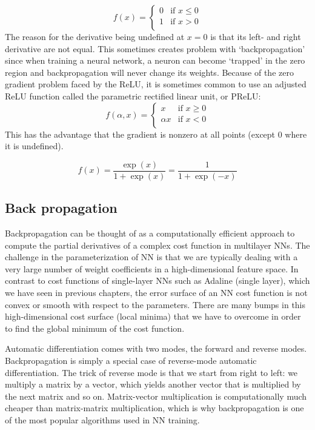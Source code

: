 \documentclass[11pt]{article}
\begin{document}
\begin{equation} 
f(x)=
\begin{cases} 
0 & \text{if  }  x \le 0 \\
1 & \text{if  }  x > 0 \\
\end{cases}
\end{equation} 
The reason for the derivative being undefined at $x=0$ is that its left- and right derivative are not equal. 
This sometimes creates problem with `backpropagation' since 
when training a neural network, a neuron can become `trapped' in the zero region 
and backpropagation will never change its weights. Because of the zero gradient problem faced by the ReLU, 
it is sometimes common to use an adjusted ReLU function called the parametric rectified linear unit, or PReLU:
\begin{equation} 
f(\alpha, x)=
\begin{cases} 
x & \text{if  }  x \ge 0 \\
\alpha x & \text{if  }  x < 0 \\
\end{cases}
\end{equation} 
This has the advantage that the gradient is nonzero at all points (except 0 where it is undefined).


\begin{equation} 
f(x) = \dfrac{\exp(x)}{1+\exp(x)} = \dfrac{1}{1+\exp(-x)}
\end{equation} 



\subsection{Back propagation} 


Backpropagation can be thought of 
as a computationally efficient approach to 
compute the partial derivatives of a complex cost function
in multilayer NNs. The challenge in the parameterization of NN
is that we are typically dealing with a very large number of weight coefficients in a 
high-dimensional feature space. In contrast to cost functions of single-layer NNs such as 
Adaline (single layer), which we have seen in previous chapters, the error 
surface of an NN cost function is not convex or smooth with respect to the parameters. 
There are many bumps in this high-dimensional cost surface (local minima) 
that we have to overcome in order to find the global minimum of the cost function.

Automatic differentiation comes with two modes, the forward and reverse modes.
Backpropagation is simply a special case of reverse-mode automatic differentiation.
The trick of reverse mode is that we start from right to left: we multiply a matrix by a vector, 
which yields another vector that is multiplied by the next matrix and so on. 
Matrix-vector multiplication is computationally much cheaper than matrix-matrix multiplication, 
which is why backpropagation is one of the most popular algorithms used in NN training.
\end{document}
